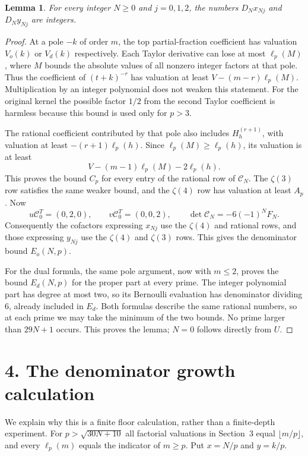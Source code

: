 \documentclass[11pt]{article}
\newtheorem{lemma}{Lemma}
\begin{document}
\begin{lemma}\label{lem:integer}
For every integer $N\ge0$ and $j=0,1,2$, the numbers $D_Nx_{Nj}$ and
$D_Ny_{Nj}$ are integers.
\end{lemma}
\begin{proof}
At a pole $-k$ of order $m$, the top partial-fraction coefficient has
valuation $V_o(k)$ or $V_d(k)$ respectively. Each Taylor derivative can
lose at most $\ell_p(M)$, where $M$ bounds the absolute values of all
nonzero integer factors at that pole. Thus the coefficient of
$(t+k)^{-r}$ has valuation at least $V-(m-r)\ell_p(M)$.
Multiplication by an integer polynomial does not weaken this statement.
For the original kernel the possible factor $1/2$ from the second Taylor
coefficient is harmless because this bound is used only for $p>3$.

The rational coefficient contributed by that pole also includes
$H_h^{(r+1)}$, with valuation at least $-(r+1)\ell_p(h)$. Since
$\ell_p(M)\ge\ell_p(h)$, its valuation is at least
\[
 V-(m-1)\ell_p(M)-2\ell_p(h).
\]
This proves the bound $C_p$ for every entry of the rational row of
$\mathcal C_N$. The $\zeta(3)$ row satisfies the same weaker bound, and
the $\zeta(4)$ row has valuation at least $A_p$.
Now
\[
 u\mathcal C_0^T=(0,2,0),\qquad v\mathcal C_0^T=(0,0,2),\qquad
 \det\mathcal C_N=-6(-1)^NF_N.
\]
Consequently the cofactors expressing $x_{Nj}$ use the $\zeta(4)$ and
rational rows, and those expressing $y_{Nj}$ use the $\zeta(4)$ and
$\zeta(3)$ rows. This gives the denominator bound $E_o(N,p)$.

For the dual formula, the same pole argument, now with $m\le2$, proves
the bound $E_d(N,p)$ for the proper part at every prime. The integer
polynomial part has degree at most two, so its Bernoulli evaluation has
denominator dividing $6$, already included in $E_d$.
Both formulas describe the same rational numbers, so at each prime we
may take the minimum of the two bounds. No prime larger than $29N+1$
occurs. This proves the lemma; $N=0$ follows directly from $U$.
\end{proof}

\section*{4. The denominator growth calculation}
We explain why this is a finite floor calculation, rather than a finite-depth
experiment. For $p>\sqrt{30N+10}$ all factorial valuations in Section~3
equal $\lfloor m/p\rfloor$, and every $\ell_p(m)$ equals the indicator
of $m\ge p$. Put $x=N/p$ and $y=k/p$.
\end{document}
